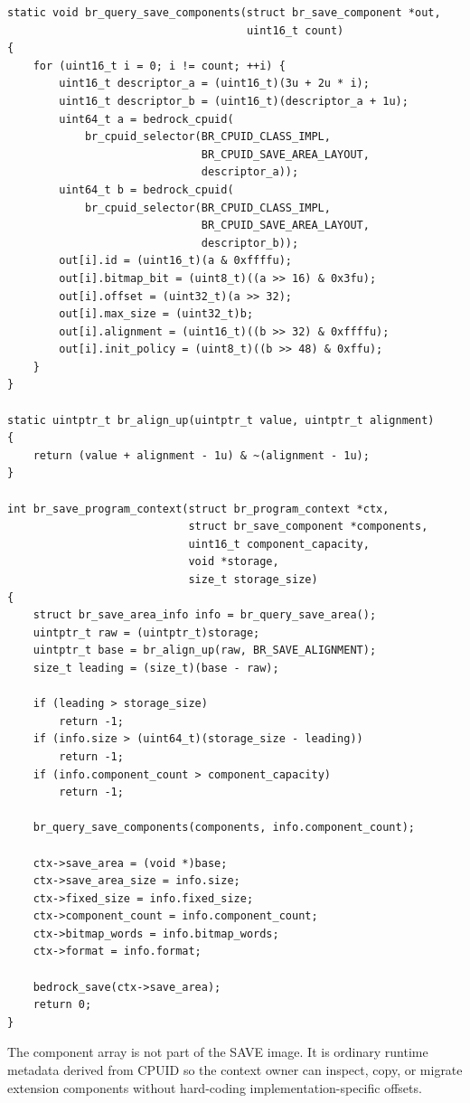 \begin{verbatim}
static void br_query_save_components(struct br_save_component *out,
                                     uint16_t count)
{
    for (uint16_t i = 0; i != count; ++i) {
        uint16_t descriptor_a = (uint16_t)(3u + 2u * i);
        uint16_t descriptor_b = (uint16_t)(descriptor_a + 1u);
        uint64_t a = bedrock_cpuid(
            br_cpuid_selector(BR_CPUID_CLASS_IMPL,
                              BR_CPUID_SAVE_AREA_LAYOUT,
                              descriptor_a));
        uint64_t b = bedrock_cpuid(
            br_cpuid_selector(BR_CPUID_CLASS_IMPL,
                              BR_CPUID_SAVE_AREA_LAYOUT,
                              descriptor_b));
        out[i].id = (uint16_t)(a & 0xffffu);
        out[i].bitmap_bit = (uint8_t)((a >> 16) & 0x3fu);
        out[i].offset = (uint32_t)(a >> 32);
        out[i].max_size = (uint32_t)b;
        out[i].alignment = (uint16_t)((b >> 32) & 0xffffu);
        out[i].init_policy = (uint8_t)((b >> 48) & 0xffu);
    }
}

static uintptr_t br_align_up(uintptr_t value, uintptr_t alignment)
{
    return (value + alignment - 1u) & ~(alignment - 1u);
}

int br_save_program_context(struct br_program_context *ctx,
                            struct br_save_component *components,
                            uint16_t component_capacity,
                            void *storage,
                            size_t storage_size)
{
    struct br_save_area_info info = br_query_save_area();
    uintptr_t raw = (uintptr_t)storage;
    uintptr_t base = br_align_up(raw, BR_SAVE_ALIGNMENT);
    size_t leading = (size_t)(base - raw);

    if (leading > storage_size)
        return -1;
    if (info.size > (uint64_t)(storage_size - leading))
        return -1;
    if (info.component_count > component_capacity)
        return -1;

    br_query_save_components(components, info.component_count);

    ctx->save_area = (void *)base;
    ctx->save_area_size = info.size;
    ctx->fixed_size = info.fixed_size;
    ctx->component_count = info.component_count;
    ctx->bitmap_words = info.bitmap_words;
    ctx->format = info.format;

    bedrock_save(ctx->save_area);
    return 0;
}
\end{verbatim}
\endgroup\par

The component array is not part of the SAVE image. It is ordinary runtime metadata derived from CPUID so the
context owner can inspect, copy, or migrate extension components without hard-coding implementation-specific
offsets.
